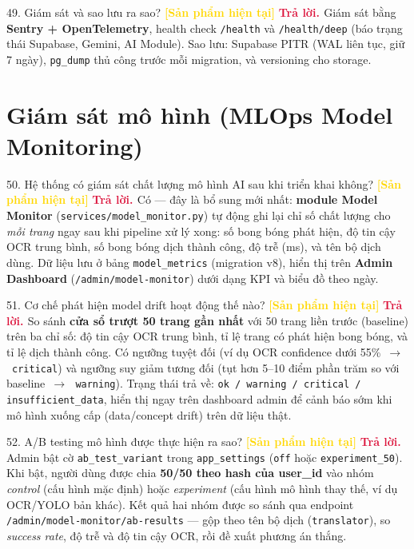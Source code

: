 \documentclass[11pt]{article}
\newcommand{\arr}{\,\ensuremath{\rightarrow}\,}
\newcommand{\tagSP}{\textcolor{gold}{\footnotesize\textbf{[Sản phẩm hiện tại]}}}
\newcommand{\A}{\textbf{\textcolor{crimson}{Trả lời. }}}
\begin{document}
\begin{qa}{49. Giám sát và sao lưu ra sao? \tagSP}
\A Giám sát bằng \textbf{Sentry + OpenTelemetry}, health check \texttt{/health} và \texttt{/health/deep} (báo trạng thái Supabase, Gemini, AI Module). Sao lưu: Supabase PITR (WAL liên tục, giữ 7 ngày), \texttt{pg\_dump} thủ công trước mỗi migration, và versioning cho storage.
\end{qa}

\section{Giám sát mô hình (MLOps Model Monitoring)}

\begin{qa}{50. Hệ thống có giám sát chất lượng mô hình AI sau khi triển khai không? \tagSP}
\A Có --- đây là bổ sung mới nhất: \textbf{module Model Monitor} (\texttt{services/model\_monitor.py}) tự động ghi lại chỉ số chất lượng cho \textit{mỗi trang} ngay sau khi pipeline xử lý xong: số bong bóng phát hiện, độ tin cậy OCR trung bình, số bong bóng dịch thành công, độ trễ (ms), và tên bộ dịch dùng. Dữ liệu lưu ở bảng \texttt{model\_metrics} (migration v8), hiển thị trên \textbf{Admin Dashboard} (\texttt{/admin/model-monitor}) dưới dạng KPI và biểu đồ theo ngày.
\end{qa}

\begin{qa}{51. Cơ chế phát hiện model drift hoạt động thế nào? \tagSP}
\A So sánh \textbf{cửa sổ trượt 50 trang gần nhất} với 50 trang liền trước (baseline) trên ba chỉ số: độ tin cậy OCR trung bình, tỉ lệ trang có phát hiện bong bóng, và tỉ lệ dịch thành công. Có ngưỡng tuyệt đối (ví dụ OCR confidence dưới 55\% \arr\ \texttt{critical}) và ngưỡng suy giảm tương đối (tụt hơn 5--10 điểm phần trăm so với baseline \arr\ \texttt{warning}). Trạng thái trả về: \texttt{ok / warning / critical / insufficient\_data}, hiển thị ngay trên dashboard admin để cảnh báo sớm khi mô hình xuống cấp (data/concept drift) trên dữ liệu thật.
\end{qa}

\begin{qa}{52. A/B testing mô hình được thực hiện ra sao? \tagSP}
\A Admin bật cờ \texttt{ab\_test\_variant} trong \texttt{app\_settings} (\texttt{off} hoặc \texttt{experiment\_50}). Khi bật, người dùng được chia \textbf{50/50 theo hash của user\_id} vào nhóm \textit{control} (cấu hình mặc định) hoặc \textit{experiment} (cấu hình mô hình thay thế, ví dụ OCR/YOLO bản khác). Kết quả hai nhóm được so sánh qua endpoint \texttt{/admin/model-monitor/ab-results} --- gộp theo tên bộ dịch (\texttt{translator}), so \textit{success rate}, độ trễ và độ tin cậy OCR, rồi đề xuất phương án thắng.
\end{qa}
\end{document}
